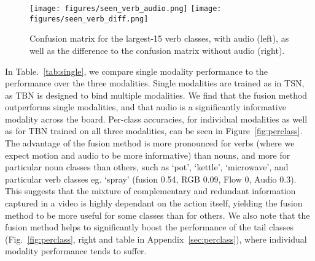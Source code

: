 \documentclass[10pt,twocolumn,letterpaper]{article}
\begin{document}
\begin{figure}[t]
	\centering
	\texttt{[image: figures/seen\_verb\_audio.png]}
	\texttt{[image: figures/seen\_verb\_diff.png]} 
	\caption{Confusion matrix for the largest-15 verb classes, with audio (left), as well as the difference to the confusion matrix without audio (right).}
	\label{fig:conf_mat}
\end{figure}



In Table.~\ref{tab:single}, we compare single modality performance to the performance over the three modalities. Single modalities are trained as in TSN, as TBN is designed to bind multiple modalities. We find that the fusion method outperforms single modalities, and that audio is a significantly informative modality across the board. 
Per-class accuracies, for individual modalities as well as for TBN trained on all three modalities, can be seen in Figure~\ref{fig:perclass}. The advantage of the fusion method is more pronounced for verbs (where we expect motion and audio to be more informative) than nouns, and more for particular noun classes than others, such as `pot', `kettle', `microwave', and particular verb classes eg. `spray' (fusion 0.54, RGB 0.09, Flow 0, Audio 0.3). This suggests that the mixture of complementary and redundant information captured in a video is highly dependant on the action itself, yielding the fusion method to be more useful for some classes than for others. We also note that the fusion method helps to significantly boost the performance of the tail classes (Fig.~\ref{fig:perclass}, right and table in Appendix~\ref{sec:perclass}), where individual modality performance tends to suffer. 
\end{document}
